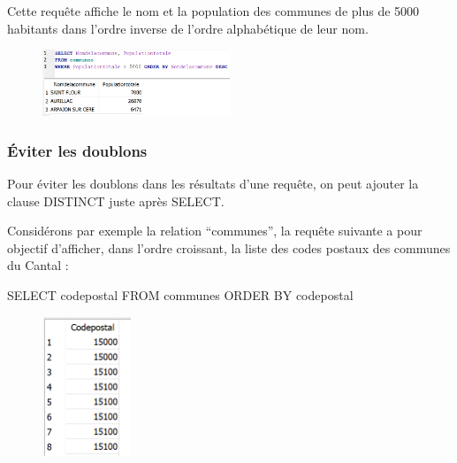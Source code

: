 \documentclass[
  letterpaper,
  DIV=11,
  numbers=noendperiod]{scrartcl}
\newenvironment{Shaded}{\begin{snugshade}}{\end{snugshade}}
\newcommand{\KeywordTok}[1]{\textcolor[rgb]{0.00,0.23,0.31}{#1}}
\newcommand{\NormalTok}[1]{\textcolor[rgb]{0.00,0.23,0.31}{#1}}
\begin{document}
Cette requête affiche le nom et la population des communes de plus de
5000 habitants dans l'ordre inverse de l'ordre alphabétique de leur nom.

\begin{figure}

{\centering \includegraphics[width=0.5\textwidth,height=\textheight]{SQL6.png}

}

\end{figure}

\hypertarget{uxe9viter-les-doublons}{%
\subsubsection{Éviter les doublons}\label{uxe9viter-les-doublons}}

Pour éviter les doublons dans les résultats d'une requête, on peut
ajouter la clause DISTINCT juste après SELECT.

Considérons par exemple la relation ``communes'', la requête suivante a
pour objectif d'afficher, dans l'ordre croissant, la liste des codes
postaux des communes du Cantal :

\begin{Shaded}
\begin{Highlighting}[]
\KeywordTok{SELECT}\NormalTok{ codepostal}
\KeywordTok{FROM}\NormalTok{ communes}
\KeywordTok{ORDER} \KeywordTok{BY}\NormalTok{ codepostal}
\end{Highlighting}
\end{Shaded}

\begin{figure}

{\centering \includegraphics[width=1.04167in,height=\textheight]{SQL7.png}

}

\end{figure}
\end{document}
